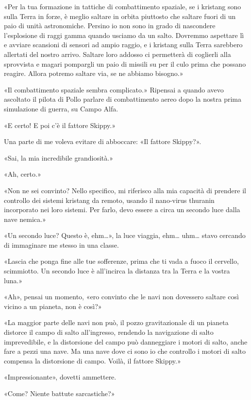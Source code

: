 «Per la tua formazione in tattiche di combattimento spaziale, se i
kristang sono sulla Terra in forze, è meglio saltare in orbita piuttosto
che saltare fuori di un paio di unità astronomiche. Persino io non sono
in grado di nascondere l'esplosione di raggi gamma quando usciamo da un
salto. Dovremmo aspettare lì e avviare scansioni di sensori ad ampio
raggio, e i kristang sulla Terra sarebbero allertati del nostro arrivo.
Saltare loro addosso ci permetterà di coglierli alla sprovvista e magari
pompargli un paio di missili su per il culo prima che possano reagire.
Allora potremo saltare via, se ne abbiamo bisogno.»

«Il combattimento spaziale sembra complicato.» Ripensai a quando avevo
ascoltato il pilota di Pollo parlare di combattimento aereo dopo la
nostra prima simulazione di guerra, su Campo Alfa.

«E certo! E poi c'è il fattore Skippy.»

Una parte di me voleva evitare di abboccare: «Il fattore Skippy?».

«Sai, la mia incredibile grandiosità.»

«Ah, certo.»

«Non ne sei convinto? Nello specifico, mi riferisco alla mia capacità di
prendere il controllo dei sistemi kristang da remoto, usando il
nano-virus thuranin incorporato nei loro sistemi. Per farlo, devo essere
a circa un secondo luce dalla nave nemica.»

«Un secondo luce? Questo è, ehm\ldots», la luce viaggia, ehm\ldots{}
uhm\ldots{} stavo cercando di immaginare me stesso in una classe.

«Lascia che ponga fine alle tue sofferenze, prima che ti vada a fuoco il
cervello, scimmiotto. Un secondo luce è all'incirca la distanza tra la
Terra e la vostra luna.»

«Ah», pensai un momento, «ero convinto che le navi non dovessero saltare
così vicino a un pianeta, non è così?»

«La maggior parte delle navi non può, il pozzo gravitazionale di un
pianeta distorce il campo di salto all'ingresso, rendendo la navigazione
di salto imprevedibile, e la distorsione del campo può danneggiare i
motori di salto, anche fare a pezzi una nave. Ma una nave dove ci sono
io che controllo i motori di salto compensa la distorsione di campo.
Voilà, il fattore Skippy.»

«Impressionante», dovetti ammettere.

«Come? Niente battute sarcastiche?»

